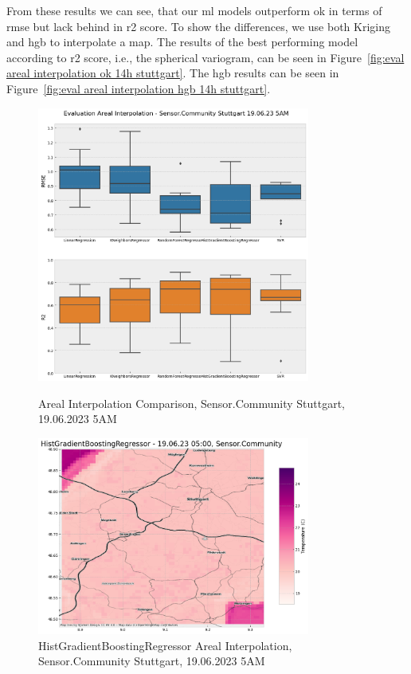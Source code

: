 From these results we can see, that our \gls{ml} models outperform \gls{ok} in terms of \gls{rmse} but lack behind in \gls{r2} score. To show the differences, we use both Kriging and \gls{hgb} to interpolate a map. The results of the best performing model according to \gls{r2} score, i.e., the spherical variogram, can be seen in Figure~\ref{fig:eval areal interpolation ok 14h stuttgart}. The \gls{hgb} results can be seen in Figure~\ref{fig:eval areal interpolation hgb 14h stuttgart}.\\

\begin{figure}[htp]
    \centering
    \includegraphics[width=0.8\textwidth]{images/eval areal interpolation 19.06.2023 5h.png}
    \caption{Areal Interpolation Comparison, Sensor.Community Stuttgart, 19.06.2023 5AM}
    \label{fig:eval areal interpolation 5h stuttgart}

    \includegraphics[width=0.8\textwidth]{images/eval areal interpolation hgb 5h.png}
    \caption{HistGradientBoostingRegressor Areal Interpolation, Sensor.Community Stuttgart, 19.06.2023 5AM}
    \label{fig:eval areal interpolation 5h stuttgart map}
\end{figure}

